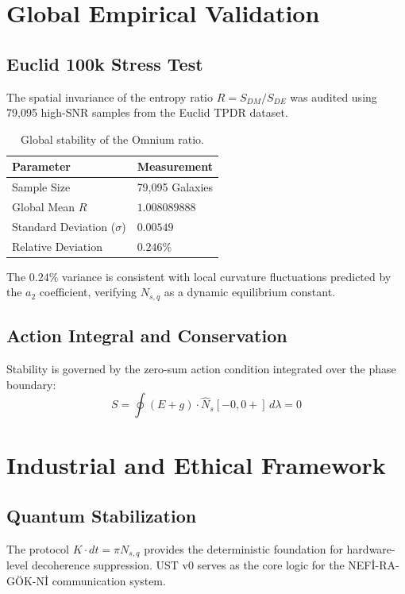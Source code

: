 \documentclass[11pt,a4paper,twocolumn]{article}
\begin{document}
\section{Global Empirical Validation}

\subsection{Euclid 100k Stress Test}
The spatial invariance of the entropy ratio $R = S_{DM}/S_{DE}$ was audited using 79,095 high-SNR samples from the Euclid TPDR dataset. 

\begin{table}[h!]
\centering
\small
\begin{tabular}{@{}ll@{}}
\toprule
\textbf{Parameter} & \textbf{Measurement} \\ \midrule
Sample Size & 79,095 Galaxies \\
Global Mean $R$ & $1.008089888$ \\
Standard Deviation ($\sigma$) & $0.00549$ \\
Relative Deviation & $0.246\%$ \\ \bottomrule
\end{tabular}
\caption{Global stability of the Omnium ratio.}
\end{table}

The $0.24\%$ variance is consistent with local curvature fluctuations predicted by the $a_2$ coefficient, verifying $N_{s,q}$ as a dynamic equilibrium constant.

\subsection{Action Integral and Conservation}
Stability is governed by the zero-sum action condition integrated over the phase boundary:
\begin{equation}
    S = \oint \left( E + g \right) \cdot \hat{N}_s[-0, 0+] \, d\lambda = 0
\end{equation}

\section{Industrial and Ethical Framework}
\subsection{Quantum Stabilization}
The protocol $K \cdot dt = \pi N_{s,q}$ provides the deterministic foundation for hardware-level decoherence suppression. UST v0 serves as the core logic for the NEFİ-RA-GÖK-Nİ communication system.
\end{document}
